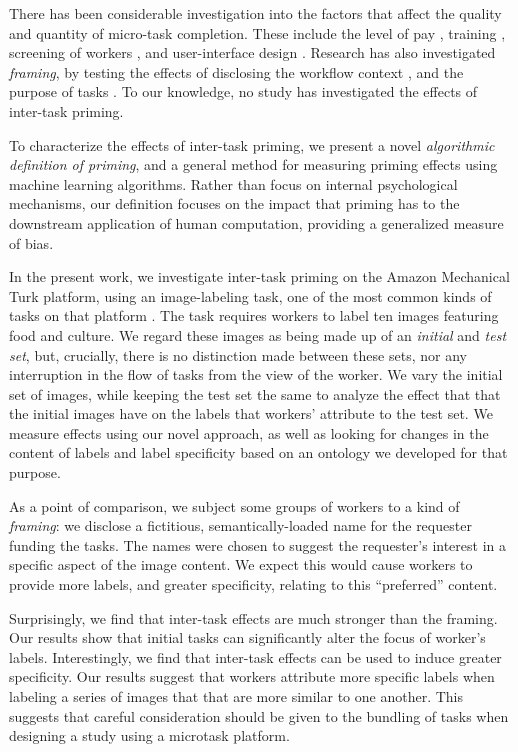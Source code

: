 \documentclass[letterpaper]{article}
\begin{document}
There has been considerable investigation into the factors that affect the 
quality and quantity of micro-task completion.  These include the level of 
pay \cite{kazai2013analysis}, training \cite{le2010ensuring}, screening of 
workers \cite{paolacci2010running}, and user-interface design 
\cite{Finnerty2013}.  Research has also investigated \textit{framing}, 
by testing the effects of disclosing the workflow context 
\cite{Kinnaird2012281}, and the purpose of tasks 
\cite{chandler2013breaking}.  To our knowledge, no study has investigated the 
effects of inter-task priming.

To characterize the effects of inter-task priming, we present a novel  
\textit{algorithmic definition of priming}, and a general method 
for measuring priming effects using machine learning algorithms.  
Rather than focus on internal psychological mechanisms, our definition 
focuses on the impact that priming has to the downstream application of human 
computation, providing a generalized measure of bias.

In the present work, we investigate inter-task priming on the Amazon 
Mechanical Turk platform, using an image-labeling task, one of the most common 
kinds of tasks on that platform 
\cite{chandler2013breaking,Berinsky2012351,Finnerty2013,paolacci2010running}.  The task requires workers to label ten 
images featuring 
food and culture.  We regard these images as being made up of an 
\textit{initial} and \textit{test set}, but, crucially, there is no
distinction made between these sets, nor any interruption in the flow of tasks 
from the view of the worker.
We vary the initial set of images, while keeping the test set the same to 
analyze the effect that that the initial images have on the labels that 
workers' attribute to the test set.  We measure effects using our novel 
approach, as well as looking for changes in the content of labels and label 
specificity based on an ontology we developed for that purpose.

As a point of comparison, we subject some groups of workers to a kind of
\textit{framing}: we disclose a fictitious, semantically-loaded name for 
the requester funding the tasks.
The names were chosen to suggest the requester's interest in a specific 
aspect of the image content.  We expect this would cause workers 
to provide more labels, and greater specificity, relating to this 
``preferred'' content.

Surprisingly, we find that inter-task effects are much stronger than the 
framing.  Our results show that initial tasks can significantly alter the 
focus of worker's labels.  Interestingly, we find that inter-task
effects can be used to induce greater specificity.  Our results suggest that
workers attribute more specific labels when labeling a series of images that
that are more similar to one another.  This suggests that careful 
consideration should be given to the bundling of tasks when designing a study 
using a microtask platform.
\end{document}
